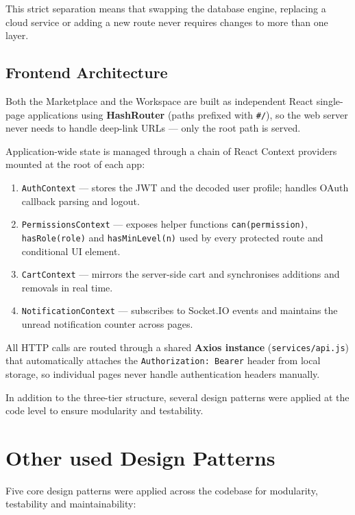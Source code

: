 This strict separation means that swapping the database engine, replacing a cloud service or adding a new route never requires changes to more than one layer.

\subsection{Frontend Architecture}

Both the Marketplace and the Workspace are built as independent React single-page applications using \textbf{HashRouter} (paths prefixed with \texttt{\#/}), so the web server never needs to handle deep-link URLs — only the root path is served.

Application-wide state is managed through a chain of React Context providers mounted at the root of each app:

\begin{enumerate}[leftmargin=2em,itemsep=3pt]
  \item \texttt{AuthContext} --- stores the JWT and the decoded user profile; handles OAuth callback parsing and logout.
  \item \texttt{PermissionsContext} --- exposes helper functions \texttt{can(permission)}, \texttt{hasRole(role)} and \texttt{hasMinLevel(n)} used by every protected route and conditional UI element.
  \item \texttt{CartContext} --- mirrors the server-side cart and synchronises additions and removals in real time.
  \item \texttt{NotificationContext} --- subscribes to Socket.IO events and maintains the unread notification counter across pages.
\end{enumerate}

All HTTP calls are routed through a shared \textbf{Axios instance} (\texttt{services/api.js}) that automatically attaches the \texttt{Authorization: Bearer} header from local storage, so individual pages never handle authentication headers manually.

In addition to the three-tier structure, several design patterns were applied at the code level to ensure modularity and testability.

\section{Other used Design Patterns}

Five core design patterns were applied across the codebase for modularity, testability and maintainability:

